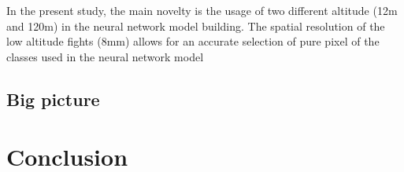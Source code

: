 \documentclass[
  number]{elsarticle}
\begin{document}
In the present study, the main novelty is the usage of two different
altitude (12m and 120m) in the neural network model building. The
spatial resolution of the low altitude fights (8mm) allows for an
accurate selection of pure pixel of the classes used in the neural
network model

\subsection{Big picture}\label{big-picture}

\section{Conclusion}\label{conclusion}


\renewcommand\refname{Bibliography}
  
\end{document}
